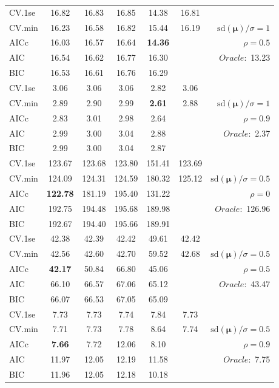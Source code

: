 \begin{table}
\begin{center}
\begin{tabular}{l*{5}{c}|r}
 \hline 
CV.1se & 16.82 & 16.83 & 16.85 & 14.38 & 16.81 & \\
CV.min & 16.23 & 16.58 & 16.82 & 15.44 & 16.19 &  $\mathrm{sd}(\mathbf{\mu})/\sigma=1$ \\
AICc & 16.03 & 16.57 & 16.64 & {\bf 14.36} & & $\rho=0.5$ \\
AIC & 16.54 & 16.62 & 16.77 & 16.30 & &  \multirow{2}{*}{$Oracle: $ 13.23} \\
BIC & 16.53 & 16.61 & 16.76 & 16.29 & &  \\
 \hline 
CV.1se & 3.06 & 3.06 & 3.06 & 2.82 & 3.06 & \\
CV.min & 2.89 & 2.90 & 2.99 & {\bf 2.61} & 2.88 &  $\mathrm{sd}(\mathbf{\mu})/\sigma=1$ \\
AICc & 2.83 & 3.01 & 2.98 & 2.64 & & $\rho=0.9$ \\
AIC & 2.99 & 3.00 & 3.04 & 2.88 & &  \multirow{2}{*}{$Oracle: $ 2.37} \\
BIC & 2.99 & 3.00 & 3.04 & 2.87 & &  \\
 \hline 
CV.1se & 123.67 & 123.68 & 123.80 & 151.41 & 123.69 & \\
CV.min & 124.09 & 124.31 & 124.59 & 180.32 & 125.12 &  $\mathrm{sd}(\mathbf{\mu})/\sigma=0.5$ \\
AICc & {\bf 122.78} & 181.19 & 195.40 & 131.22 & & $\rho=0$ \\
AIC & 192.75 & 194.48 & 195.68 & 189.98 & &  \multirow{2}{*}{$Oracle: $ 126.96} \\
BIC & 192.67 & 194.40 & 195.66 & 189.91 & &  \\
 \hline 
CV.1se & 42.38 & 42.39 & 42.42 & 49.61 & 42.42 & \\
CV.min & 42.56 & 42.60 & 42.70 & 59.52 & 42.68 &  $\mathrm{sd}(\mathbf{\mu})/\sigma=0.5$ \\
AICc & {\bf 42.17} & 50.84 & 66.80 & 45.06 & & $\rho=0.5$ \\
AIC & 66.10 & 66.57 & 67.06 & 65.12 & &  \multirow{2}{*}{$Oracle: $ 43.47} \\
BIC & 66.07 & 66.53 & 67.05 & 65.09 & &  \\
 \hline 
CV.1se & 7.73 & 7.73 & 7.74 & 7.84 & 7.73 & \\
CV.min & 7.71 & 7.73 & 7.78 & 8.64 & 7.74 &  $\mathrm{sd}(\mathbf{\mu})/\sigma=0.5$ \\
AICc & {\bf 7.66} & 7.72 & 12.06 & 8.10 & & $\rho=0.9$ \\
AIC & 11.97 & 12.05 & 12.19 & 11.58 & &  \multirow{2}{*}{$Oracle: $ 7.75} \\
BIC & 11.96 & 12.05 & 12.18 & 10.18 & &  \\
 \hline 
\end{tabular}
\end{center}
\vspace{-1cm}
\end{table}





